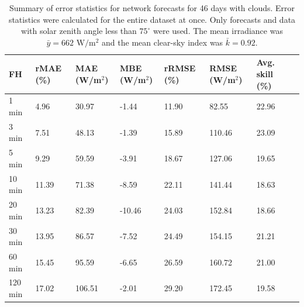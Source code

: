 \begin{table}
\centering
\caption[Error statistics for network forecasts]{
  Summary of error statistics for network forecasts for 46
  days with clouds. Error statistics were calculated for the entire
  dataset at once. Only forecasts and data with solar zenith angle
  less than $75^\circ$ were used. The mean irradiance was $\bar{y} =
  662 \mbox{ W/m$^2$}$ and the mean clear-sky index was $\bar{k} =
  0.92$.
}
\begin{tabular}{llllllll}
\toprule
FH &  rMAE (\%) &  MAE (W/m$^2$) &  MBE (W/m$^2$) &  rRMSE (\%) &  RMSE (W/m$^2$) &  Avg. skill (\%) \\
\midrule
 1 min  &      4.96 &          30.97 &          -1.44 &      11.90 &           82.55 &           22.96 \\
 3 min  &      7.51 &          48.13 &          -1.39 &      15.89 &          110.46 &           23.09 \\
 5 min  &      9.29 &          59.59 &          -3.91 &      18.67 &          127.06 &           19.65 \\
10 min  &     11.39 &          71.38 &          -8.59 &      22.11 &          141.44 &           18.63 \\
20 min  &     13.23 &          82.39 &         -10.46 &      24.03 &          152.84 &           18.66 \\
30 min  &     13.95 &          86.57 &          -7.52 &      24.49 &          154.15 &           21.21 \\
60 min  &     15.45 &          95.59 &          -6.65 &      26.59 &          160.72 &           21.00 \\
120 min &     17.02 &         106.51 &          -2.01 &      29.20 &          172.45 &           19.58 \\
\bottomrule
\end{tabular}
\label{table:network_errors}
\end{table}

